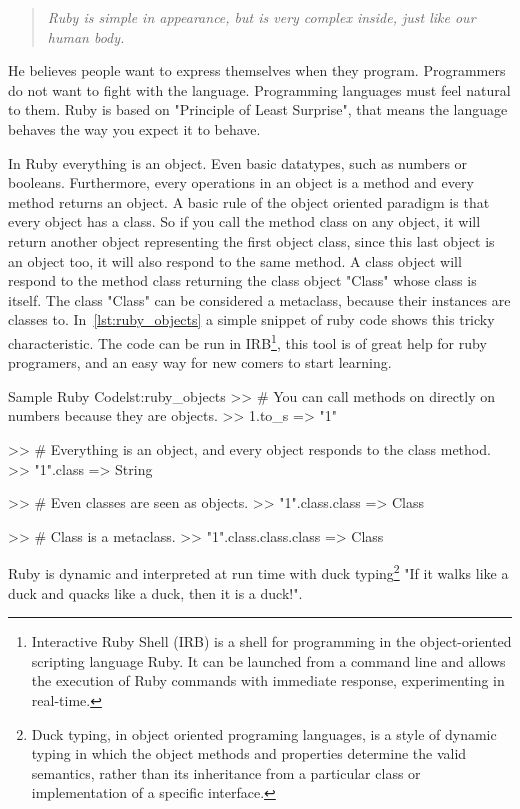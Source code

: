 \begin{quote}\emph{
  Ruby is simple in appearance, but is very complex inside, just like our human body.
}\end{quote}

He believes people want to express themselves when they program. 
Programmers do not want to fight with the language.
Programming languages must feel natural to them.
Ruby is based on "Principle of Least Surprise", 
that means the language behaves the way you expect it to behave.

In Ruby everything is an object. Even basic datatypes, such as numbers or booleans.
Furthermore, every operations in an object is a method and every method returns an object.
A basic rule of the object oriented paradigm is that every object has a class.
So if you call the method class on any object,
it will return another object representing the first object class, 
since this last object is an object too, 
it will also respond to the same method. 
A class object will respond to the method class returning the class object "Class" whose class is itself. 
The class "Class" can be considered a metaclass, because their instances are classes to.
In~\ref{lst:ruby_objects} a simple snippet of ruby code shows this tricky characteristic.
The code can be run in 
\textsf{IRB}\footnote{
  Interactive Ruby Shell (IRB) is a shell for programming in the object-oriented scripting language Ruby.
  It can be launched from a command line and allows the execution of Ruby commands with immediate response, 
  experimenting in real-time.
 },
this tool is of great help for ruby programers,
and an easy way for new comers to start learning.

\begin{rubycode}{Sample Ruby Code}{lst:ruby_objects}
  >> # You can call methods on directly on numbers because they are objects.
  >> 1.to_s
  => "1"

  >> # Everything is an object, and every object responds to the class method.
  >> "1".class
  => String

  >> # Even classes are seen as objects.
  >> "1".class.class
  => Class

  >> # Class is a metaclass. 
  >> "1".class.class.class
  => Class
\end{rubycode}

Ruby is dynamic and interpreted at run time with 
\textsf{duck typing}\footnote{
  Duck typing, in object oriented programing languages, 
  is a style of dynamic typing in which the object methods and properties determine the valid semantics, 
  rather than its inheritance from a particular class or implementation of a specific interface.
} 
"If it walks like a duck and quacks like a duck, then it is a duck!".

